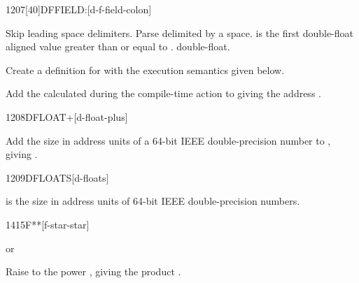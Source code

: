 \begin{worddef}{1207}[40]{DFFIELD:}[d-f-field-colon]%
\item {}

	Skip leading space delimiters. Parse  delimited by
	a space.  is the first double-float aligned value
	greater than or equal to .  
	double-float.

	Create a definition for  with the execution semantics
	given below.

\execute[name]

	Add the  calculated during the compile-time action to
	 giving the address .

\end{worddef}


\begin{worddef}{1208}{DFLOAT+}[d-float-plus]
\item {}

	Add the size in address units of a 64-bit IEEE double-precision
	number to , giving .

\end{worddef}


\begin{worddef}{1209}{DFLOATS}[d-floats]
\item {}

	 is the size in address units of  64-bit
	IEEE double-precision numbers.
	
\end{worddef}


\begin{worddef}{1415}{F**}[f-star-star]
\item {} or

	Raise  to the power , giving the product
	.
\end{worddef}


